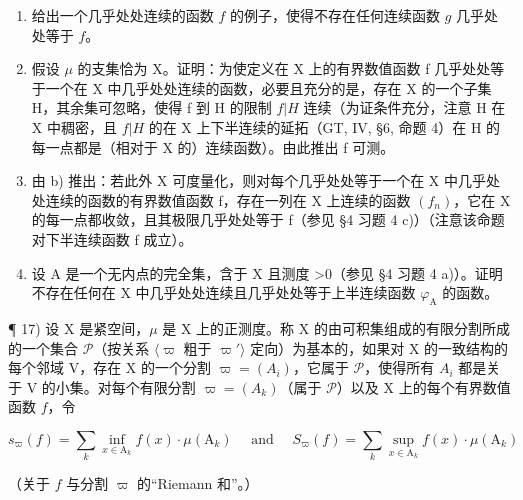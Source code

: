 \begin{enumerate}
\def\labelenumi{\alph{enumi})}
\item
  给出一个几乎处处连续的函数 \(f\) 的例子，使得不存在任何连续函数 \(g\) 几乎处处等于 \(f\)。
\item
  假设 \(\mu\) 的支集恰为 X。证明：为使定义在 X 上的有界数值函数 f 几乎处处等于一个在 X 中几乎处处连续的函数，必要且充分的是，存在 X 的一个子集 H，其余集可忽略，使得 f 到 H 的限制 \(f|H\) 连续（为证条件充分，注意 H 在 X 中稠密，且 \(f|H\) 的在 X 上下半连续的延拓（GT, IV, §6, 命题 4）在 H 的每一点都是（相对于 X 的）连续函数）。由此推出 f 可测。
\item
  由 b) 推出：若此外 X 可度量化，则对每个几乎处处等于一个在 X 中几乎处处连续的函数的有界数值函数 f，存在一列在 X 上连续的函数 \((f_{n})\)，它在 X 的每一点都收敛，且其极限几乎处处等于 f（参见 §4 习题 4 c)）（注意该命题对下半连续函数 f 成立）。
\item
  设 A 是一个无内点的完全集，含于 X 且测度 \textgreater0（参见 §4 习题 4 a)）。证明不存在任何在 X 中几乎处处连续且几乎处处等于上半连续函数 \(\varphi_{\mathrm{A}}\) 的函数。
\end{enumerate}

¶ 17) 设 X 是紧空间，\(\mu\) 是 X 上的正测度。称 X 的由可积集组成的有限分割所成的一个集合 \(\mathcal{P}\)（按关系 \(\langle\varpi\) 粗于 \(\varpi'\rangle\) 定向）为基本的，如果对 X 的一致结构的每个邻域 V，存在 X 的一个分割 \(\varpi = (A_i)\)，它属于 \(\mathcal{P}\)，使得所有 \(A_i\) 都是关于 V 的小集。对每个有限分割 \(\varpi = (A_k)\)（属于 \(\mathcal{P}\)）以及 X 上的每个有界数值函数 \(f\)，令

\[
s _ {\varpi} (f) = \sum_ {k} \inf _ {x \in \mathrm{A} _ {k}} f (x) \cdot \mu (\mathrm{A} _ {k}) \quad \text { and } \quad S _ {\varpi} (f) = \sum_ {k} \sup _ {x \in \mathrm{A} _ {k}} f (x) \cdot \mu (\mathrm{A} _ {k})
\]

（关于 \(f\) 与分割 \(\varpi\) 的“Riemann 和”。）


